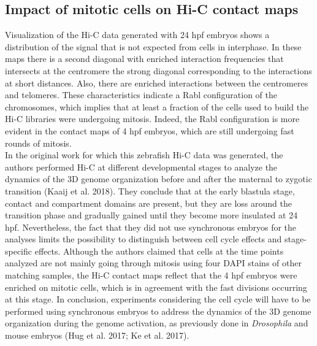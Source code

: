 		\subsection{Impact of mitotic cells on Hi-C contact maps}

Visualization of the Hi-C data generated with 24 hpf embryos shows a distribution of the signal that is not expected from cells in interphase. In these maps there is a second diagonal with enriched interaction frequencies that intersects at the centromere the strong diagonal corresponding to the interactions at short distances. Also, there are enriched interactions between the centromeres and telomeres. These characteristics indicate a Rabl configuration of the chromosomes, which implies that at least a fraction of the cells used to build the Hi-C libraries were undergoing mitosis. Indeed, the Rabl configuration is more evident in the contact maps of 4 hpf embryos, which are still undergoing fast rounds of mitosis.\\

In the original work for which this zebrafish Hi-C data was generated, the authors performed Hi-C at different developmental stages to analyze the dynamics of the 3D genome organization before and after the maternal to zygotic transition (Kaaij et al. 2018). They conclude that at the early blastula stage, contact and compartment domains are present, but they are loss around the transition phase and gradually gained until they become more insulated at 24 hpf. Nevertheless, the fact that they did not use synchronous embryos for the analyses limits the possibility to distinguish between cell cycle effects and stage-specific effects. Although the authors claimed that cells at the time points analyzed are not mainly going through mitosis using four DAPI stains of other matching samples, the Hi-C contact maps reflect that the 4 hpf embryos were enriched on mitotic cells, which is in agreement with the fast divisions occurring at this stage. In conclusion, experiments considering the cell cycle will have to be performed using synchronous embryos to address the dynamics of the 3D genome organization during the genome activation, as previously done in \textit{Drosophila} and mouse embryos (Hug et al. 2017; Ke et al. 2017).\\

